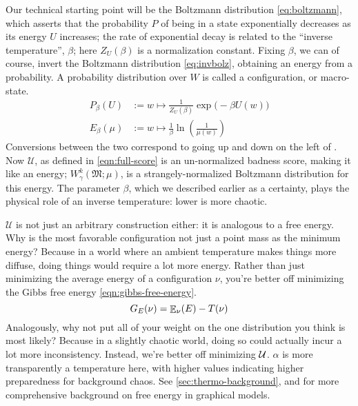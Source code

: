 \documentclass{article}
\theoremstyle{plain}
\theoremstyle{definition}
\theoremstyle{remark}
\let\H\relax
\DeclareMathOperator{\H}{\mathrm{H}} %
\DeclareMathOperator*{\E}{\mathbb{E}} %
\newcommand{\dg}[1]{\mathfrak{#1}}
\numberwithin{equation}{section}
\begin{document}
	Our technical starting point will be the Boltzmann distribution \eqref{eq:boltzmann}, which asserts that the probability $P$ of being in a state exponentially decreases as its energy $U$ increases; the rate of exponential decay is related to the ``inverse temperature'', $\beta$; here $Z_U(\beta)$ is a normalization constant. Fixing $\beta$, we can of course, invert the Boltzmann distribution \eqref{eq:invbolz}, obtaining an energy from a probability. A probability distribution over $W$ is called a configuration, or macro-state.
 	\begin{align}
	 P_{\beta}(U) &:= w \mapsto  \frac{1}{Z_U(\beta)}\exp\Big(-\beta U(w)\Big) \label{eq:boltzmann} \\
 		E_{\beta}(\mu) &:= w \mapsto \frac{1}{\beta} \ln \left(\frac{1}{\mu(w)}\right) \label{eq:invbolz}
 	\end{align}
 	Conversions between the two correspond to going up and down on the left of . 
 	Now $\mathcal U$, as defined in \eqref{eqn:full-score} is an un-normalized badness score, making it like an energy; $W^k_\gamma(\dg M; \mu)$, is a strangely-normalized Boltzmann distribution for this energy. The parameter $\beta$, which we described earlier as a certainty, plays the physical role of an inverse temperature: lower is more chaotic. 
 	
 	$\mathcal U$ is not just an arbitrary construction either: it is analogous to a free energy. Why is the most favorable configuration not just a point mass as the minimum energy? Because in a world where an ambient temperature makes things more diffuse, doing things would require a lot more energy. Rather than just minimizing the average energy of a configuration $\nu$, you're better off minimizing the Gibbs free energy \eqref{eqn:gibbs-free-energy}. 
 	\begin{equation}
 		G_E(\nu) = {\E}_\nu( E )  - T \H(\nu) \label{eqn:gibbs-free-energy}
 	\end{equation}
 	Analogously, why not put all of your weight on the one distribution you think is most likely? Because in a slightly chaotic world, doing so could actually incur a lot more inconsistency. Instead, we're better off minimizing $\cal U$. $\alpha$ is more transparently a temperature here, with higher values indicating higher preparedness for background chaos. 
	See \ref{sec:thermo-background}, and \cite{bethe,friston2009free} for more comprehensive background on free energy
	in graphical models.
	
\end{document}
